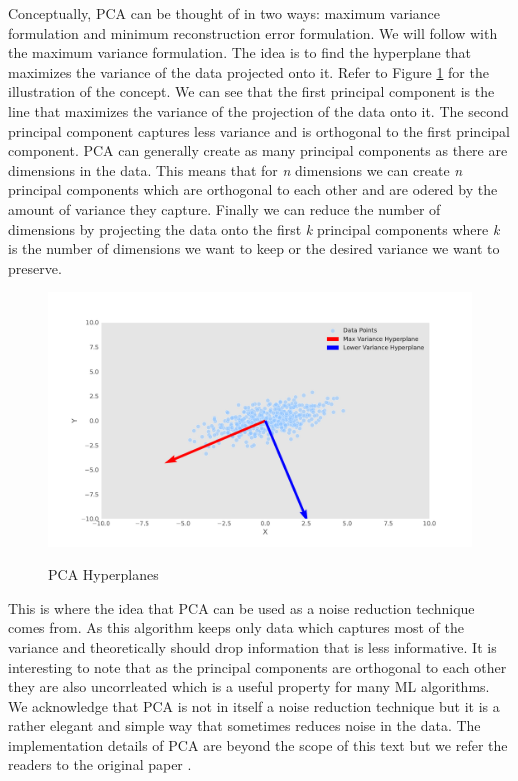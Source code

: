 Conceptually, \ac{PCA} can be thought of in two ways: maximum variance formulation
and minimum reconstruction error formulation. We will follow with the maximum variance formulation.
The idea is to find the hyperplane that maximizes the variance of the data projected onto it.
Refer to Figure \ref{fig:pca} for the illustration of the concept. We can see
that the first principal component is the line that maximizes the variance of the projection
of the data onto it. The second principal component captures
less variance and is orthogonal to the first principal component. \ac{PCA} can
generally create as many principal components as there are dimensions in the data.
This means that for \textit{n} dimensions we can create \textit{n} principal components which
are orthogonal to each other and are odered by the amount of variance they capture. 
Finally we can reduce the number of dimensions by projecting the data onto the first \textit{k} principal components
where \textit{k} is the number of dimensions we want to keep or the desired variance 
we want to preserve.

\begin{figure}[!h]
    \centering
    \caption{\ac{PCA} Hyperplanes}
        \includegraphics[width=1\textwidth]{Figures/pca_plot.pdf}
    \label{fig:pca}
\end{figure}

This is where the idea that \ac{PCA} can be used as a noise reduction technique comes from.
As this algorithm keeps only data which captures most of the variance
and theoretically should drop information that is less informative.
It is interesting to note that as the principal components are orthogonal to each other 
they are also uncorrleated which is a useful property for many \ac{ML} algorithms. 
We acknowledge that \ac{PCA} is not in itself a noise reduction technique
but it is a rather elegant and simple way that sometimes reduces noise in the data.
The implementation details of \ac{PCA} are beyond the scope of this text but we refer the readers
to the original paper \cite{Pearson1901}.





